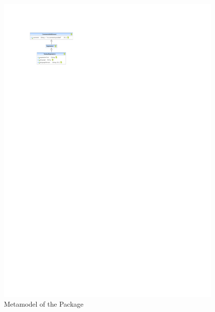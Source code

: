 %
%

\begin{figure}[htb]
  \centering
  \includegraphics[scale=2]{figures/A_technical-reference/packages/core_expressions/core-expressions}
  \caption{Metamodel of the  Package}
  \label{fig:MM:expressions}
\end{figure}
